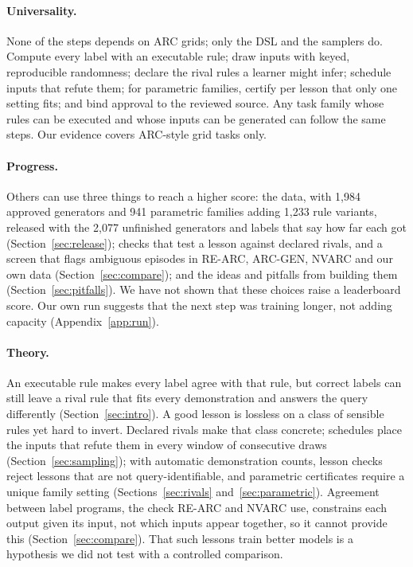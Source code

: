 \documentclass[11pt]{article}
\begin{document}
\paragraph{Universality.} None of the steps depends on ARC grids; only the DSL
and the samplers do. Compute every label with an executable rule; draw inputs
with keyed, reproducible randomness; declare the rival rules a learner might
infer; schedule inputs that refute them; for parametric families, certify per
lesson that only one setting fits; and bind approval to the reviewed source.
Any task family whose rules can be executed and whose inputs can be generated
can follow the same steps. Our evidence covers ARC-style grid tasks only.

\paragraph{Progress.} Others can use three things to reach a higher score: the
data, with 1,984 approved generators and 941 parametric families adding 1,233
rule variants, released with the 2,077 unfinished generators and labels that
say how far each got (Section~\ref{sec:release}); checks that test a lesson
against declared rivals, and a screen that flags ambiguous episodes in RE-ARC,
ARC-GEN, NVARC and our own data (Section~\ref{sec:compare}); and the ideas and
pitfalls from building them (Section~\ref{sec:pitfalls}). We have not shown
that these choices raise a leaderboard score. Our own run suggests that the
next step was training longer, not adding capacity (Appendix~\ref{app:run}).

\paragraph{Theory.} An executable rule makes every label agree with that rule,
but correct labels can still leave a rival rule that fits every demonstration and answers
the query differently (Section~\ref{sec:intro}). A good lesson is lossless on a
class of sensible rules yet hard to invert. Declared rivals make that class
concrete; schedules place the inputs that refute them in every window of
consecutive draws (Section~\ref{sec:sampling}); with automatic demonstration
counts, lesson checks reject lessons that are not query-identifiable, and
parametric certificates require a unique family setting
(Sections~\ref{sec:rivals} and~\ref{sec:parametric}). Agreement between label programs, the check RE-ARC
and NVARC use, constrains each output given its input, not which inputs appear
together, so it cannot provide this (Section~\ref{sec:compare}). That such
lessons train better models is a hypothesis we did not test with a controlled
comparison.
\end{document}
